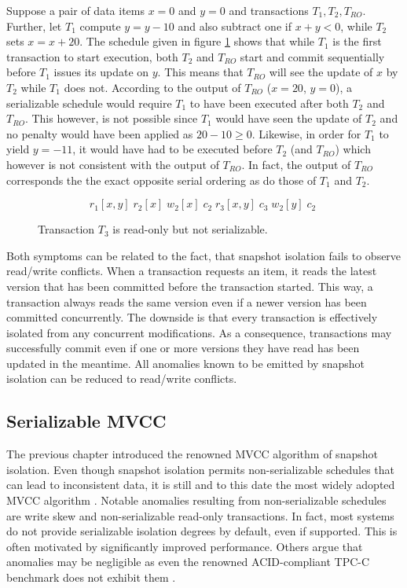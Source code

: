 Suppose a pair of data items $x = 0$ and $y = 0$ and transactions $T_1, T_2,
T_{RO}$. Further, let $T_1$ compute $y = y - 10$ and also subtract one if $x + y <
0$, while $T_2$ sets $x = x + 20$. The schedule given in figure
\ref{fig:bad_read_only} shows that while $T_1$ is the first transaction to start
execution, both $T_2$ and $T_{RO}$ start and commit sequentially before $T_1$
issues its update on $y$. This means that $T_{RO}$ will see the update of $x$ by
$T_2$ while $T_1$ does not. According to the output of $T_{RO}$ ($x = 20$, $y =
0$), a serializable schedule would require $T_1$ to have been executed after
both $T_2$ and $T_{RO}$. This however, is not possible since $T_1$ would have
seen the update of $T_2$ and no penalty would have been applied as $20 - 10 \geq
0$. Likewise, in order for $T_1$ to yield $y = -11$, it would have had to be
executed before $T_2$ (and $T_{RO}$) which however is not consistent with the
output of $T_{RO}$. In fact, the output of $T_{RO}$ corresponds the the exact
opposite serial ordering as do those of $T_1$ and $T_2$.

\begin{figure}[h!]
    \centering
    \[
        r_1[x,y]\; r_2[x]\; w_2[x]\; c_2\; r_3[x,y]\; c_3\; w_2[y]\; c_2\;
    \]
    \caption{Transaction $T_3$ is read-only but not serializable.}
    \label{fig:bad_read_only}
\end{figure}

Both symptoms can be related to the fact, that snapshot isolation fails to
observe read/write conflicts. When a transaction requests an item, it reads the
latest version that has been committed before the transaction started. This way,
a transaction always reads the same version even if a newer version has been
committed concurrently. The downside is that every transaction is effectively
isolated from any concurrent modifications. As a consequence, transactions may
successfully commit even if one or more versions they have read has been updated
in the meantime. All anomalies known to be emitted by snapshot isolation can be
reduced to read/write conflicts.

\subsection{Serializable MVCC}

The previous chapter introduced the renowned MVCC algorithm of snapshot
isolation. Even though snapshot isolation permits non-serializable schedules
that can lead to inconsistent data, it is still and to this date the most widely
adopted MVCC algorithm \cite{cahill2009serializable, larson2011high,
sikka2012efficient, neumann2015fast}. Notable anomalies resulting from
non-serializable schedules are write skew and non-serializable read-only
transactions. In fact, most systems do not provide serializable isolation
degrees by default, even if supported. This is often motivated by significantly
improved performance. Others argue that anomalies may be negligible as even the
renowned ACID-compliant TPC-C benchmark does not exhibit them
\cite{fekete2005making}.

